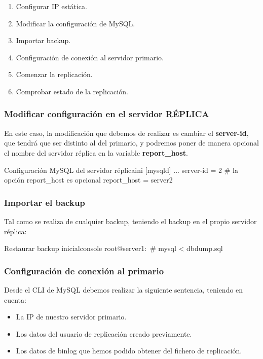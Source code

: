 \begin{enumerate}
    \item Configurar IP estática.
    \item Modificar la configuración de MySQL.
    \item Importar backup.
    \item Configuración de conexión  al servidor primario.
    \item Comenzar la replicación.
    \item Comprobar estado de la replicación.
\end{enumerate}


\subsubsection{Modificar configuración en el servidor RÉPLICA}
En este caso, la modificación que debemos de realizar es cambiar el \textbf{server-id}, que tendrá que ser distinto al del primario, y podremos poner de manera opcional el nombre del servidor réplica en la variable \textbf{report\_host}.


\begin{mycode}{Configuración MySQL del servidor réplica}{ini}{}
[mysqld]
...
server-id = 2
# la opción report_host es opcional
report_host = server2
\end{mycode}


\subsubsection{Importar el backup}
Tal como se realiza de cualquier backup, teniendo el backup en el propio servidor réplica:

\begin{mycode}{Restaurar backup inicial}{console}{}
root@server1:~# mysql < dbdump.sql
\end{mycode}


\subsubsection{Configuración de conexión al primario}
Desde el CLI de MySQL debemos realizar la siguiente sentencia, teniendo en cuenta:
\begin{itemize}
    \item La IP de nuestro servidor primario.
    \item Los datos del usuario de replicación creado previamente.
    \item Los datos de binlog que hemos podido obtener del fichero de replicación.
\end{itemize}

